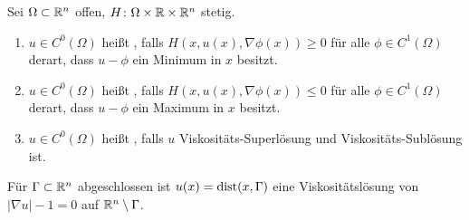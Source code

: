 \begin{defn}[Viskositätslösung] \label{def_22}
	Sei $\Omega \subset \mathbb{R}^n$ offen, $H\colon \Omega \times \mathbb{R} \times \mathbb{R}^n$ stetig. \marginnote{[22]}
	\begin{enumerate}
		\item $u \in C^0(\Omega)$ heißt , falls $H(x,u(x),\nabla\phi(x)) \geq 0$ für alle $\phi \in C^1(\Omega)$ derart, dass $u-\phi$ ein Minimum in $x$ besitzt.
		\item $u \in C^0(\Omega)$ heißt , falls $H(x,u(x),\nabla\phi(x)) \leq 0$ für alle $\phi \in C^1(\Omega)$ derart, dass $u-\phi$ ein Maximum in $x$ besitzt.
		\item $u \in C^0(\Omega)$ heißt , falls $u$ Viskositäts-Superlösung und Viskositäts-Sublösung ist.
	\end{enumerate}
\end{defn}

\begin{bsp}[Abstandsfunktion]\label{lemma_23}
	Für $\Gamma \subset \mathbb{R}^n$ abgeschlossen ist $u(x) = \operatorname{dist}(x,\Gamma)$ eine Viskositätslösung von $|\nabla u| - 1 = 0$ auf $\mathbb{R}^n \setminus \Gamma$. \marginnote{[23]}
\end{bsp}
	
